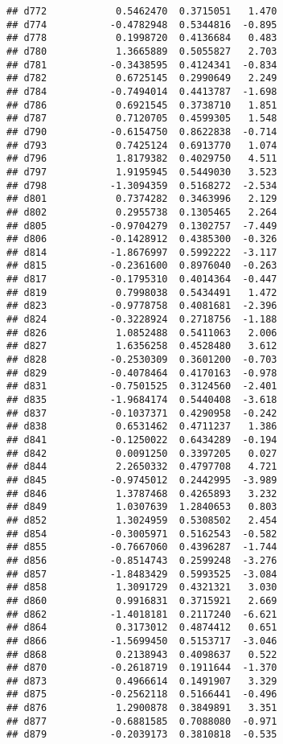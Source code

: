 \documentclass[
]{article}
\begin{document}
\begin{verbatim}
## d772            0.5462470  0.3715051   1.470
## d774           -0.4782948  0.5344816  -0.895
## d778            0.1998720  0.4136684   0.483
## d780            1.3665889  0.5055827   2.703
## d781           -0.3438595  0.4124341  -0.834
## d782            0.6725145  0.2990649   2.249
## d784           -0.7494014  0.4413787  -1.698
## d786            0.6921545  0.3738710   1.851
## d787            0.7120705  0.4599305   1.548
## d790           -0.6154750  0.8622838  -0.714
## d793            0.7425124  0.6913770   1.074
## d796            1.8179382  0.4029750   4.511
## d797            1.9195945  0.5449030   3.523
## d798           -1.3094359  0.5168272  -2.534
## d801            0.7374282  0.3463996   2.129
## d802            0.2955738  0.1305465   2.264
## d805           -0.9704279  0.1302757  -7.449
## d806           -0.1428912  0.4385300  -0.326
## d814           -1.8676997  0.5992222  -3.117
## d815           -0.2361600  0.8976040  -0.263
## d817           -0.1795310  0.4014364  -0.447
## d819            0.7998038  0.5434491   1.472
## d823           -0.9778758  0.4081681  -2.396
## d824           -0.3228924  0.2718756  -1.188
## d826            1.0852488  0.5411063   2.006
## d827            1.6356258  0.4528480   3.612
## d828           -0.2530309  0.3601200  -0.703
## d829           -0.4078464  0.4170163  -0.978
## d831           -0.7501525  0.3124560  -2.401
## d835           -1.9684174  0.5440408  -3.618
## d837           -0.1037371  0.4290958  -0.242
## d838            0.6531462  0.4711237   1.386
## d841           -0.1250022  0.6434289  -0.194
## d842            0.0091250  0.3397205   0.027
## d844            2.2650332  0.4797708   4.721
## d845           -0.9745012  0.2442995  -3.989
## d846            1.3787468  0.4265893   3.232
## d849            1.0307639  1.2840653   0.803
## d852            1.3024959  0.5308502   2.454
## d854           -0.3005971  0.5162543  -0.582
## d855           -0.7667060  0.4396287  -1.744
## d856           -0.8514743  0.2599248  -3.276
## d857           -1.8483429  0.5993525  -3.084
## d858            1.3091729  0.4321321   3.030
## d860            0.9916831  0.3715921   2.669
## d862           -1.4018181  0.2117240  -6.621
## d864            0.3173012  0.4874412   0.651
## d866           -1.5699450  0.5153717  -3.046
## d868            0.2138943  0.4098637   0.522
## d870           -0.2618719  0.1911644  -1.370
## d873            0.4966614  0.1491907   3.329
## d875           -0.2562118  0.5166441  -0.496
## d876            1.2900878  0.3849891   3.351
## d877           -0.6881585  0.7088080  -0.971
## d879           -0.2039173  0.3810818  -0.535

\end{verbatim}
\end{document}
